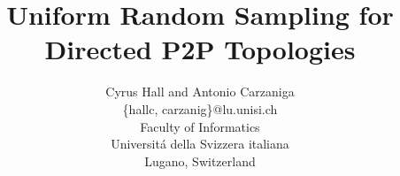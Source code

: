 \documentclass[11pt,twocolumn]{article}
\begin{document}
\title{Uniform Random Sampling for Directed P2P Topologies}
\author{Cyrus Hall and Antonio Carzaniga\\
  \{hallc, carzanig\}@lu.unisi.ch\\
  Faculty of Informatics\\
	Universit\'{a} della Svizzera italiana\\
  Lugano, Switzerland
}

\date{}

\maketitle




%
%
%
%
\end{document}
